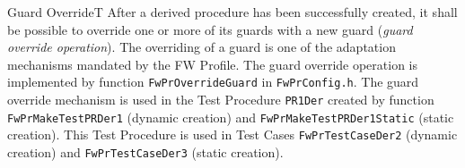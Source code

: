 \documentclass[requirements]{../fwprofile}
\begin{document}
\begin{fw_req}{Guard Override}{T}
{After a derived procedure has been successfully created, it shall be possible to override one or more of its guards with 
a new guard (\emph{guard override operation}).}
{The overriding of a guard is one of the adaptation mechanisms mandated by the FW Profile.}
{The guard override operation is implemented by function \texttt{FwPrOverrideGuard} in \texttt{FwPrConfig.h}.} 
{The guard override mechanism is used in the Test Procedure \texttt{PR1Der} created by function 
\texttt{FwPrMakeTestPRDer1} (dynamic creation) and \texttt{FwPrMakeTestPRDer1Static} (static creation). This Test Procedure is used in 
Test Cases \texttt{FwPrTestCaseDer2} (dynamic creation) and \texttt{FwPrTestCaseDer3} (static creation).}
\end{fw_req}


\end{document}
